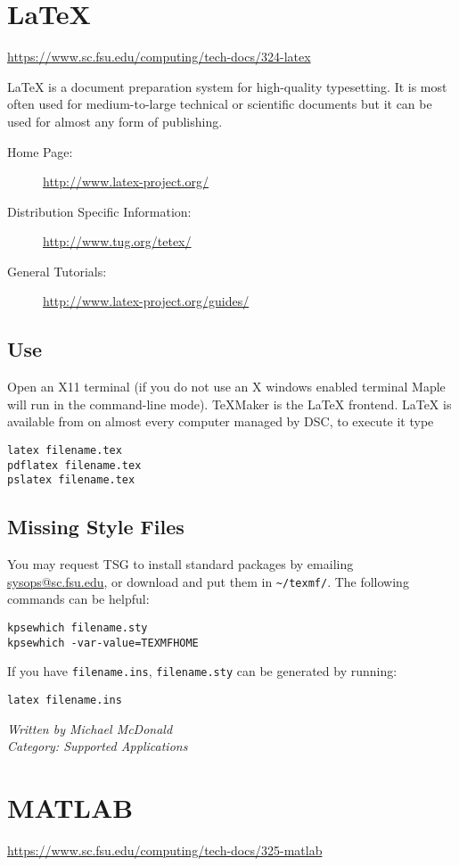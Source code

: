 \documentclass[12pt,a4paper]{article}
\begin{document}
\section{LaTeX}
\url{https://www.sc.fsu.edu/computing/tech-docs/324-latex}

LaTeX is a document preparation system for high-quality typesetting.
It is most often used for medium-to-large technical or scientific
documents but it can be used for almost any form of publishing.
\begin{description}
    \item[Home Page:] \url{http://www.latex-project.org/}
    \item[Distribution Specific Information:] \url{http://www.tug.org/tetex/}
    \item[General Tutorials:] \url{http://www.latex-project.org/guides/}
\end{description}

\subsection*{Use}
Open an X11 terminal (if you do not use an X windows enabled terminal Maple will run in the command-line mode).
TeXMaker is the LaTeX frontend.
LaTeX is available from on almost every computer managed by DSC, to execute it type
\begin{verbatim}
latex filename.tex
pdflatex filename.tex
pslatex filename.tex
\end{verbatim}

\subsection*{Missing Style Files}
You may request TSG to install standard packages by emailing \href{mailto:sysops@sc.fsu.edu}{sysops@sc.fsu.edu}, or download and put them in \texttt{\textasciitilde{}/texmf/}. The following commands can be helpful:
\begin{verbatim}
kpsewhich filename.sty
kpsewhich -var-value=TEXMFHOME
\end{verbatim}
If you have \texttt{filename.ins}, \texttt{filename.sty} can be generated by running:
\begin{verbatim}
latex filename.ins
\end{verbatim}
\hfill \textit{Written by Michael McDonald} \\
\hfill \textit{Category: Supported Applications}

\section{MATLAB}
\url{https://www.sc.fsu.edu/computing/tech-docs/325-matlab}
\end{document}
